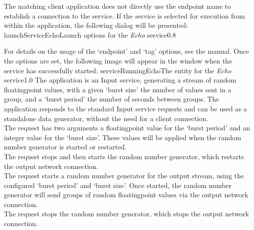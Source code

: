 \insertAutoAppParameters
{}
The matching client application does not directly use the endpoint name to establish a
connection to the service.
\condPage
If the service is selected for execution from within the \emph{\MMMU} application, the
following dialog will be presented:
%
{launchServiceEcho}{Launch options for the \emph{Echo} service}{0.8}

For details on the usage of the `endpoint' and `tag' options, see the \emph{\MMMU} manual.
Once the options are set, the following image will appear in the \emph{\MMMU} window when
the service has successfully started:
%
{serviceRunningEcho}{The \emph{\MMMU} entity for the \emph{Echo} service}{1.0}
The  application is an Input service,
generating a stream of random floating\longDash{}point values, with a given `burst size'
\longDash{} the number of values sent in a group, and a `burst period' \longDash{} the
number of seconds between groups.
The application responds to the standard Input service requests and can be used as a
standalone data generator, without the need for a client connection.\\

The  request has two arguments
\longDash{} a floating\longDash{}point value for the `burst period' and an integer value
for the `burst size'.
These values will be applied when the random number generator is started or restarted.\\

The  request stops and then
starts the random number generator, which restarts the output \yarp{} network
connection.\\

The  request starts a random
number generator for the output stream, using the configured `burst period' and
`burst size'.
Once started, the random number generator will send groups of random
floating\longDash{}point values via the output \yarp{} network connection.\\

The  request stops the random
number generator, which stops the output \yarp{} network connection.\\ 

